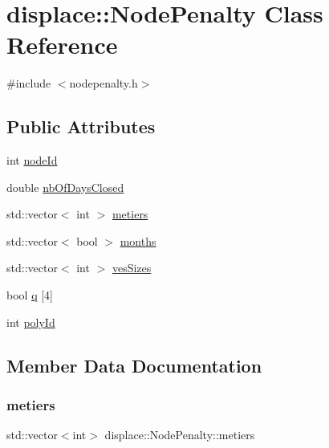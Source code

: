 \hypertarget{classdisplace_1_1_node_penalty}{}\section{displace\+::Node\+Penalty Class Reference}
\label{classdisplace_1_1_node_penalty}


{\ttfamily \#include $<$nodepenalty.\+h$>$}

\subsection*{Public Attributes}
\begin{DoxyCompactItemize}
\item 
int \mbox{\hyperlink{classdisplace_1_1_node_penalty_a607179961c143d8560f50201ecc35343}{node\+Id}}
\item 
double \mbox{\hyperlink{classdisplace_1_1_node_penalty_a73c2678b0109ea46253a5a412fff0a53}{nb\+Of\+Days\+Closed}}
\item 
std\+::vector$<$ int $>$ \mbox{\hyperlink{classdisplace_1_1_node_penalty_a62b22f5744797f63023cd4ac8ea96961}{metiers}}
\item 
std\+::vector$<$ bool $>$ \mbox{\hyperlink{classdisplace_1_1_node_penalty_a0873a6a5f63699a3f377391759994dfe}{months}}
\item 
std\+::vector$<$ int $>$ \mbox{\hyperlink{classdisplace_1_1_node_penalty_a7447cdb18d6a93118fd04aeaf3d9c055}{ves\+Sizes}}
\item 
bool \mbox{\hyperlink{classdisplace_1_1_node_penalty_af2c75bc14189b4a0e8cd43954b48a9f6}{q}} \mbox{[}4\mbox{]}
\item 
int \mbox{\hyperlink{classdisplace_1_1_node_penalty_a5db7b3573fe657e81f4dc339d7defb9b}{poly\+Id}}
\end{DoxyCompactItemize}


\subsection{Member Data Documentation}
\mbox{\label{classdisplace_1_1_node_penalty_a62b22f5744797f63023cd4ac8ea96961}} 
\subsubsection{\texorpdfstring{metiers}{metiers}}
{\footnotesize\ttfamily std\+::vector$<$int$>$ displace\+::\+Node\+Penalty\+::metiers}

